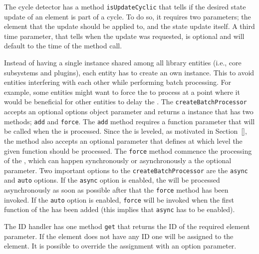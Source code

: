 \documentclass[a4paper,11pt]{kth-mag}
\newcommand{\code}[1]{\texttt{#1}}
\newcommand\abbr[2][]{\uppercase{#2}\ifthenelse{\equal{#1}{}}%
                     {}{#1}}
\begin{document}
        The cycle detector has a method \code{isUpdateCyclic} that tells if the desired state update of an element is part of a cycle.
        To do so, it requires two parameters; the element that the update should be applied to, and the state update itself.
        A third time parameter, that tells when the update was requested, is optional and will default to the time of the method call.

        Instead of having a single  instance shared among all library entities (i.e., core subsystems and plugins), each entity has to create an own instance.
        This to avoid entities interfering with each other while performing \gls{batch processing}.
        For example, some entities might want to force the  to process at a point where it would be beneficial for other entities to delay the .
        The \code{createBatchProcessor} accepts an optional options object parameter and returns a  instance that has two methods; \code{add} and \code{force}.
        The \code{add} method requires a function parameter that will be called when the  is processed.
        Since the  is leveled, as motivated in Section~\ref{}, the method also accepts an optional parameter that defines at which level the given function should be processed.
        The \code{force} method commence the processing of the , which can happen synchronously or asynchronously a the optional parameter.
        Two important options to the \code{createBatchProcessor} are the \code{async} and \code{auto} options.
        If the \code{async} option is enabled, the  will be processed asynchronously as soon as possible after that the \code{force} method has been invoked.
        If the \code{auto} option is enabled, \code{force} will be invoked when the first function of the  has been added (this implies that \code{async} has to be enabled).

        The \abbr{ID} handler has one method \code{get} that returns the \abbr{ID} of the required element parameter.
        If the element does not have any \abbr{ID} one will be assigned to the element.
        It is possible to override the assignment with an option parameter.

\end{document}
